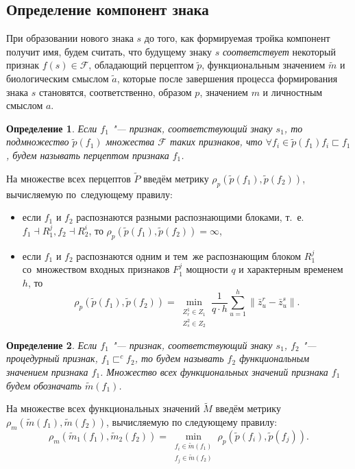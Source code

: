 \documentclass[a4paper, 12pt]{article}
\theoremstyle{plain}
\newtheorem{Def}{Определение}
\begin{document}
		\subsection{Определение компонент знака}
		При образовании нового знака $s$ до того, как формируемая тройка компонент получит имя, будем считать, что будущему знаку $s$ \textit{соответствует} некоторый признак $f(s)\in\mathcal F$, обладающий перцептом $\tilde p$, функциональным значением $\tilde m$ и биологическим смыслом $\tilde a$, которые после завершения процесса формирования знака $s$ становятся, соответственно, образом $p$, значением $m$ и личностным смыслом $a$.
		
		\begin{Def}
			Если $f_1$ "--- признак, соответствующий знаку $s_1$, то подмножество $\tilde p(f_1)$ множества $\mathcal F$ таких признаков, что $\forall f_i\in\tilde p(f_1) f_i\sqsubset f_1$, будем называть перцептом признака $f_1$.
		\end{Def}
		
		На множестве всех перцептов $\tilde P$ введём метрику $\rho_p(\tilde p(f_1),\tilde p(f_2))$, вычисляемую по~следующему правилу:
		\begin{itemize}
			\item если $f_1$ и $f_2$ распознаются разными распознающими блоками, т.~е. $f_1\dashv R_1^j, f_2\dashv R_2^i$, то $\rho_p(\tilde p(f_1),\tilde p(f_2))=\infty$,
			\item если $f_1$ и $f_2$ распознаются одним и тем~же распознающим блоком $R_1^j$ со~множеством входных признаков $F_1^j$ мощности $q$ и характерным временем $h$, то
			\begin{equation}
				\rho_p(\tilde p(f_1),\tilde p(f_2))=\min\limits_{\substack{Z_r^1\in Z_1\\Z_s^2\in Z_2}}\frac{1}{q\cdot h}\sum\limits_{u=1}^h\|\bar z_u^r-\bar z_u^s\|.
			\end{equation} 
		\end{itemize}
		
		\begin{Def}
			Если $f_1$ "--- признак, соответствующий знаку $s_1$, $f_2$ "--- процедурный признак, $f_1\sqsubset^c f_2$, то будем называть $f_2$ функциональным значением признака $f_1$. Множество всех функциональных значений признака $f_1$ будем обозначать $\tilde m(f_1)$.
		\end{Def}
		
		На множестве всех функциональных значений $\tilde M$ введём метрику $\rho_m(\tilde m(f_1),\tilde m(f_2))$, вычисляемую по следующему правилу:
		\begin{equation}
			\rho_m(\tilde m_1(f_1),\tilde m_2(f_2 ))=\min\limits_{\substack{f_i\in\tilde m(f_1 )\\f_j\in\tilde m(f_2 )}}\rho_p(\tilde p(f_i ),\tilde p(f_j )).
		\end{equation}
		
\end{document}
